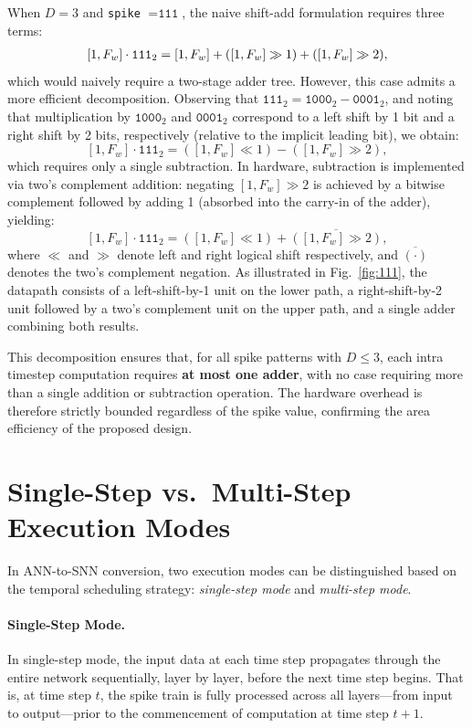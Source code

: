 When $D = 3$ and \texttt{spike} $= \texttt{111}$, the naive shift-add formulation requires three terms:
\begin{equation}
    \begin{aligned}
        \relax[1, F_w] \cdot \texttt{111}_2 = [1, F_w] + ([1, F_w] \gg 1) + ([1, F_w] \gg 2),
    \end{aligned}
\end{equation}
which would naively require a two-stage adder tree. However, this case admits a more efficient decomposition. Observing that $\texttt{111}_2 = \texttt{1000}_2 - \texttt{0001}_2$, and noting that multiplication by $\texttt{1000}_2$ and $\texttt{0001}_2$ correspond to a left shift by 1 bit and a right shift by 2 bits, respectively (relative to the implicit leading bit), we obtain:
\[
[1, F_w] \cdot \texttt{111}_2 = ([1, F_w] \ll 1) - ([1, F_w] \gg 2),
\]
which requires only a single subtraction. In hardware, subtraction is implemented via two's complement addition: negating $[1, F_w] \gg 2$ is achieved by a bitwise complement followed by adding 1 (absorbed into the carry-in of the adder), yielding:
\[
[1, F_w] \cdot \texttt{111}_2 = ([1, F_w] \ll 1) + \overline{([1, F_w] \gg 2)},
\]
where $\ll$ and $\gg$ denote left and right logical shift respectively, and $\overline{(\cdot)}$ denotes the two's complement negation. As illustrated in Fig.~\ref{fig:111}, the datapath consists of a left-shift-by-1 unit on the lower path, a right-shift-by-2 unit followed by a two's complement unit on the upper path, and a single adder combining both results.

This decomposition ensures that, for all spike patterns with $D \leq 3$, each intra timestep computation requires \textbf{at most one adder}, with no case requiring more than a single addition or subtraction operation. The hardware overhead is therefore strictly bounded regardless of the spike value, confirming the area efficiency of the proposed design.

\section{Single-Step vs.\ Multi-Step Execution Modes}

In ANN-to-SNN conversion, two execution modes can be distinguished based on the 
temporal scheduling strategy: \textit{single-step mode} and \textit{multi-step mode}.

\paragraph{Single-Step Mode.}
In single-step mode, the input data at each time step propagates through the entire 
network sequentially, layer by layer, before the next time step begins. That is, at 
time step $t$, the spike train is fully processed across all layers---from input to 
output---prior to the commencement of computation at time step $t+1$.

